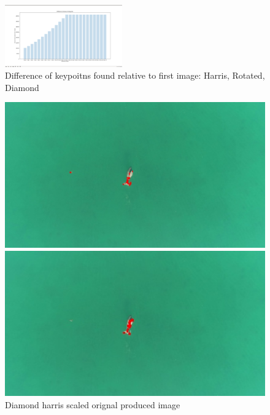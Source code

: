 \documentclass[conference]{IEEEtran}
\begin{document}
\begin{figure}[!htp]
\includegraphics[width=0.45\textwidth]{../programme/results/Task_1/scaled_experiements/Harris/dugong/diff_hists.png}
\centering
\caption{Difference of keypoitns found relative to first image: Harris, Rotated, Diamond}
\label{Difference of keypoitns found relative to first image: Harris, Rotated, Diamond}
\end{figure}

\begin{figure}[!htb]
  \centering
  \begin{minipage}[b]{0.2\textwidth}
    \includegraphics[width=\textwidth]{../programme/results/Task_1/scaled_experiements/Harris/dugong/image_0.jpg}
    \caption{Diamond harris scaled orignal produced image}
    \label{Diamond harris scaled orignal produced image}
  \end{minipage}
  \hfill
  \begin{minipage}[b]{0.2\textwidth}
    \includegraphics[width=\textwidth]{../programme/results/Task_1/scaled_experiements/Harris/dugong/image_1.jpg}

\end{minipage}
\end{figure}
\end{document}
